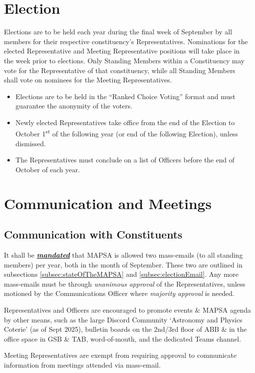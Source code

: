 \documentclass[8pt]{article}
\begin{document}
	\section{Election}\label{sec:elections}
	Elections are to be held each year during the final week of September by all members for their respective constituency's Representatives. Nominations for the elected Representative and Meeting Representative positions will take place in the week prior to elections. Only Standing Members within a Constituency may vote for the Representative of that constituency, while all Standing Members shall vote on nominees for the Meeting Representatives. 
	\begin{itemize}	
		\item Elections are to be held in the ``Ranked Choice Voting'' format and must guarantee the anonymity of the voters. 
		\item Newly elected Representatives take office from the end of the Election to October 1\textsuperscript{st} of the following year (or end of the following Election), unless dismissed.
		\item The Representatives must conclude on a list of Officers before the end of October of each year.
	\end{itemize}
	
	\section{Communication and Meetings}
	\subsection{Communication with Constituents}
	It shall be \textbf{\textit{\underline{mandated}}} that MAPSA is allowed two mass-emails (to all standing members) per year, both in the month of September. These two are outlined in subsections \ref{subsec:stateOfTheMAPSA} and \ref{subsec:electionEmail}. Any more mass-emails must be through \textit{unanimous approval} of the Representatives, unless motioned by the Communications Officer where \textit{majority approval} is needed.

	Representatives and Officers are encouraged to promote events \& MAPSA agenda by other means, such as the large Discord Community `Astronomy and Physics Coterie' (as of Sept 2025), bulletin boards on the 2nd/3rd floor of ABB \& in the office space in GSB \& TAB, word-of-mouth, and the dedicated Teams channel.
	
	Meeting Representatives are exempt from requiring approval to communicate information from meetings attended via mass-email.
\end{document}

